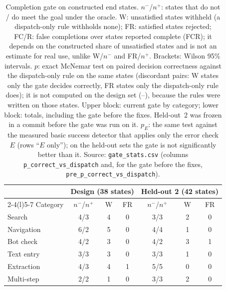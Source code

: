 \begin{table}[t]
\centering
\caption{Completion gate on constructed end states. $n^{-}$/$n^{+}$: states that do not / do meet the goal under the oracle. W: unsatisfied states withheld (a dispatch-only rule withholds none); FR: satisfied states rejected; FC/R: false completions over states reported complete (FCR); it depends on the constructed share of unsatisfied states and is not an estimate for real use, unlike W/$n^{-}$ and FR/$n^{+}$. Brackets: Wilson 95\% intervals. $p$: exact McNemar test on paired decision correctness against the dispatch-only rule on the same states (discordant pairs: W states only the gate decides correctly, FR states only the dispatch-only rule does); it is not computed on the design set (--), because the rules were written on those states. Upper block: current gate by category; lower block: totals, including the gate before the fixes. Held-out~2 was frozen in a commit before the gate was run on it. $p_{E}$: the same test against the measured basic success detector that applies only the error check $E$ (rows ``$E$ only''); on the held-out sets the gate is not significantly better than it. Source: \texttt{gate\_stats.csv} (columns \texttt{p\_correct\_vs\_dispatch} and, for the gate before the fixes, \texttt{pre\_p\_correct\_vs\_dispatch}).}
\label{tab:gate}
\footnotesize
\setlength{\tabcolsep}{2.1pt}
\begin{tabular}{@{}lcccccc@{}}
\toprule
 & \multicolumn{3}{c}{Design (38 states)} & \multicolumn{3}{c}{Held-out 2 (42 states)} \\
\cmidrule(lr){2-4}\cmidrule(l){5-7}
Category & $n^{-}$/$n^{+}$ & W & FR & $n^{-}$/$n^{+}$ & W & FR \\
\midrule
Search & 4/3 & 4 & 0 & 3/3 & 2 & 0 \\
Navigation & 6/2 & 5 & 0 & 4/4 & 1 & 0 \\
Bot check & 4/2 & 3 & 0 & 4/2 & 3 & 1 \\
Text entry & 3/3 & 3 & 0 & 3/3 & 1 & 0 \\
Extraction & 4/3 & 4 & 1 & 5/5 & 0 & 0 \\
Multi-step & 2/2 & 1 & 0 & 3/3 & 2 & 0 \\
\bottomrule
\end{tabular}


\end{table}
